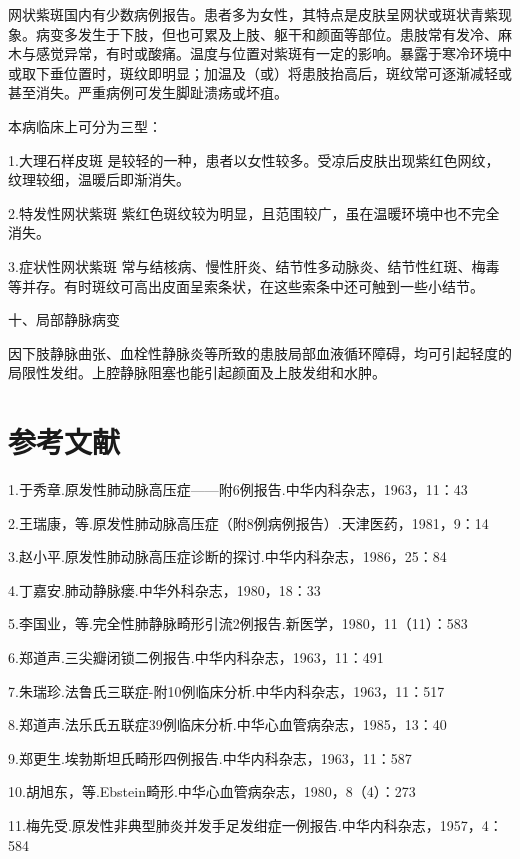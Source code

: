 网状紫斑国内有少数病例报告。患者多为女性，其特点是皮肤呈网状或斑状青紫现象。病变多发生于下肢，但也可累及上肢、躯干和颜面等部位。患肢常有发冷、麻木与感觉异常，有时或酸痛。温度与位置对紫斑有一定的影响。暴露于寒冷环境中或取下垂位置时，斑纹即明显；加温及（或）将患肢抬高后，斑纹常可逐渐减轻或甚至消失。严重病例可发生脚趾溃疡或坏疽。

本病临床上可分为三型：

1.大理石样皮斑
是较轻的一种，患者以女性较多。受凉后皮肤出现紫红色网纹，纹理较细，温暖后即渐消失。

2.特发性网状紫斑
紫红色斑纹较为明显，且范围较广，虽在温暖环境中也不完全消失。

3.症状性网状紫斑
常与结核病、慢性肝炎、结节性多动脉炎、结节性红斑、梅毒等并存。有时斑纹可高出皮面呈索条状，在这些索条中还可触到一些小结节。

\hypertarget{text00121.htmlux5cux23CHP14-5-2-2-10}{}
十、局部静脉病变

因下肢静脉曲张、血栓性静脉炎等所致的患肢局部血液循环障碍，均可引起轻度的局限性发绀。上腔静脉阻塞也能引起颜面及上肢发绀和水肿。

\protect\hypertarget{text00122.html}{}{}

\section{参考文献}

1.于秀章.原发性肺动脉高压症------附6例报告.中华内科杂志，1963，11：43

2.王瑞康，等.原发性肺动脉高压症（附8例病例报告）.天津医药，1981，9：14

3.赵小平.原发性肺动脉高压症诊断的探讨.中华内科杂志，1986，25：84

4.丁嘉安.肺动静脉瘘.中华外科杂志，1980，18：33

5.李国业，等.完全性肺静脉畸形引流2例报告.新医学，1980，11（11）：583

6.郑道声.三尖瓣闭锁二例报告.中华内科杂志，1963，11：491

7.朱瑞珍.法鲁氏三联症-附10例临床分析.中华内科杂志，1963，11：517

8.郑道声.法乐氏五联症39例临床分析.中华心血管病杂志，1985，13：40

9.郑更生.埃勃斯坦氏畸形四例报告.中华内科杂志，1963，11：587

10.胡旭东，等.Ebstein畸形.中华心血管病杂志，1980，8（4）：273

11.梅先受.原发性非典型肺炎并发手足发绀症一例报告.中华内科杂志，1957，4：584

